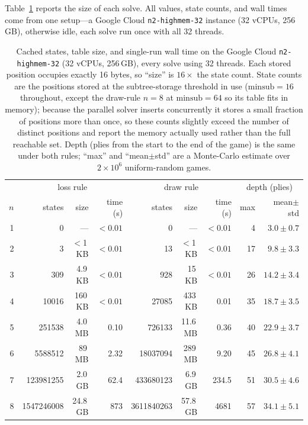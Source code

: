 \documentclass[Afour,sageapa,times]{sagej}
\theoremstyle{plain}
\theoremstyle{definition}
\newcommand{\nEightLossStates}{\num{1547246008}}
\newcommand{\drawEightStates}{\num{3611840263}}
\newcommand{\drawEightSize}{57.8\,GB}
\newcommand{\drawEightTime}{4681}
\begin{document}
Table~\ref{tab:scale} reports the size of each solve. All values, state counts, and
wall times come from one setup---a Google Cloud \texttt{n2-highmem-32} instance
(32 vCPUs, 256\,GB), otherwise idle, each solve run once with all 32 threads.

\begin{table}
\centering
\begin{tabular}{r r r r r r r r r}
\toprule
 & \multicolumn{3}{c}{loss rule} & \multicolumn{3}{c}{draw rule} & \multicolumn{2}{c}{depth (plies)} \\
\cmidrule(lr){2-4}\cmidrule(lr){5-7}\cmidrule(lr){8-9}
$n$ & states & size & time (s) & states & size & time (s) & max & mean$\pm$std \\
\midrule
1 & 0 & --- & $<0.01$ & 0 & --- & $<0.01$ & 4 & $3.0\pm0.7$ \\
2 & 3 & $<$1\,KB & $<0.01$ & 13 & $<$1\,KB & $<0.01$ & 17 & $9.8\pm3.3$ \\
3 & 309 & 4.9\,KB & $<0.01$ & 928 & 15\,KB & $<0.01$ & 26 & $14.2\pm3.4$ \\
4 & \num{10016} & 160\,KB & $<0.01$ & \num{27085} & 433\,KB & 0.01 & 35 & $18.7\pm3.5$ \\
5 & \num{251538} & 4.0\,MB & 0.10 & \num{726133} & 11.6\,MB & 0.36 & 40 & $22.9\pm3.7$ \\
6 & \num{5588512} & 89\,MB & 2.32 & \num{18037094} & 289\,MB & 9.20 & 45 & $26.8\pm4.1$ \\
7 & \num{123981255} & 2.0\,GB & 62.4 & \num{433680123} & 6.9\,GB & 234.5 & 51 & $30.5\pm4.6$ \\
8 & \nEightLossStates & 24.8\,GB & 873 & \drawEightStates & \drawEightSize & \drawEightTime & 57 & $34.1\pm5.1$ \\
\bottomrule
\end{tabular}
\caption{Cached states, table size, and single-run wall time on the Google Cloud
\texttt{n2-highmem-32} (32 vCPUs, 256\,GB), every solve using 32 threads. Each
stored position occupies exactly 16 bytes, so ``size'' is $16\times$ the state
count. State counts are the positions stored at the subtree-storage threshold in
use ($\text{minsub}=16$ throughout, except the draw-rule $n=8$ at $\text{minsub}=64$
so its table fits in memory); because the parallel solver inserts concurrently it
stores a small fraction of positions more than once, so these counts slightly
exceed the number of distinct positions and report the memory actually used rather
than the full reachable set. Depth (plies from the start to the end of the game) is
the same under both rules; ``max'' and ``mean$\pm$std'' are a Monte-Carlo estimate
over $2\times10^{6}$ uniform-random games.}
\label{tab:scale}
\end{table}
\end{document}
